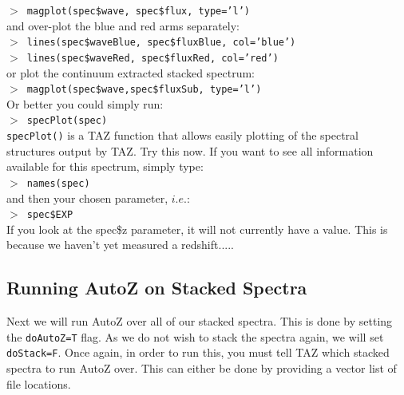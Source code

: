 \documentclass[12pt]{article}
\begin{document}
\hspace{10mm} \texttt{$>$ magplot(spec\$wave, spec\$flux, type='l')} \\

and over-plot the blue and red arms separately:\\


\hspace{10mm} \texttt{$>$ lines(spec\$waveBlue, spec\$fluxBlue, col='blue')}\\

\hspace{10mm} \texttt{$>$ lines(spec\$waveRed, spec\$fluxRed, col='red')}\\

or plot the continuum extracted stacked spectrum:\\

\hspace{10mm} \texttt{$>$ magplot(spec\$wave,spec\$fluxSub, type='l')}\\

Or better you could simply run:\\

\hspace{10mm} \texttt{$>$ specPlot(spec)}\\

\texttt{specPlot()} is a TAZ function that allows easily plotting of the spectral structures output by TAZ. Try this now. If you want to see all information available for this spectrum, simply type:\\

 \hspace{10mm} \texttt{$>$ names(spec)} \\
 
 and then your chosen parameter, $i.e.$:\\
 
 
  \hspace{10mm} \texttt{$>$ spec\$EXP} \\
  
 If you look at the spec\$z parameter, it will not currently have a value. This is because we haven't yet measured a redshift.....
 

 \subsection{Running AutoZ on Stacked Spectra}
 
 Next we will run AutoZ over all of our stacked spectra. This is done by setting the \texttt{doAutoZ=T} flag. As we do not wish to stack the spectra again, we will set \texttt{doStack=F}. Once again, in order to run this, you must tell TAZ which stacked spectra to run AutoZ over. This can either be done by providing a vector list of file locations. \\
 
\end{document}
